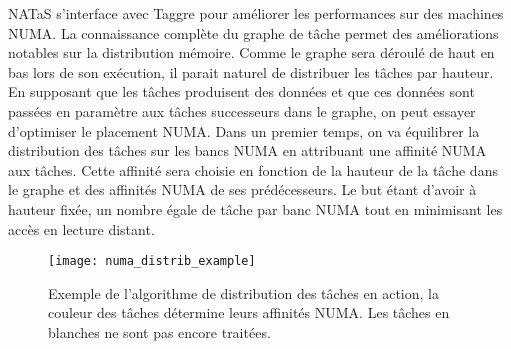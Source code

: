 NATaS s'interface avec Taggre pour améliorer les performances sur des machines NUMA.
%
La connaissance complète du graphe de tâche permet des améliorations notables sur la distribution mémoire.
%
Comme le graphe sera déroulé de haut en bas lors de son exécution, il parait naturel de distribuer les tâches par hauteur.
%
En supposant que les tâches produisent des données et que ces données sont passées en paramètre aux tâches successeurs dans le graphe, on peut essayer d'optimiser le placement NUMA.
%
Dans un premier temps, on va équilibrer la distribution des tâches sur les bancs NUMA en attribuant une affinité NUMA aux tâches.
%
Cette affinité sera choisie en fonction de la hauteur de la tâche dans le graphe et des affinités NUMA de ses prédécesseurs.
%
Le but étant d'avoir à hauteur fixée, un nombre égale de tâche par banc NUMA tout en minimisant les accès en lecture distant.



\begin{figure}[t!]
  \centering
  \texttt{[image: numa\_distrib\_example]}
  \caption{Exemple de l'algorithme de distribution des tâches en action, la couleur des tâches détermine leurs affinités NUMA. Les tâches en blanches ne sont pas encore traitées.}
  \label{fig:numa_distrib_example}
\end{figure}
